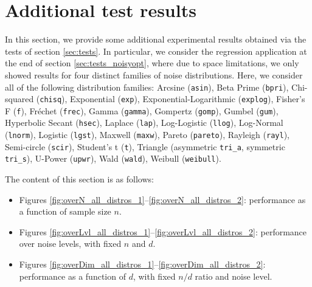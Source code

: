 \documentclass[11pt,oneside]{article}
\theoremstyle{definition} \newtheorem{defn}{Definition}       %
\theoremstyle{plain} \newtheorem{prop}[defn]{Proposition}           %
\theoremstyle{plain} \newtheorem{thm}[defn]{Theorem}                %
\theoremstyle{plain} \newtheorem{lem}[defn]{Lemma}                  %
\theoremstyle{plain} \newtheorem{cor}[defn]{Corollary}              %
\theoremstyle{remark} \newtheorem{rmk}[defn]{Remark}                %
\theoremstyle{remark} \newtheorem{ex}[defn]{Example}                %
\begin{document}
\section{Additional test results}\label{sec:more_test_results}

In this section, we provide some additional experimental results obtained via the tests of section \ref{sec:tests}. In particular, we consider the regression application at the end of section \ref{sec:tests_noisyopt}, where due to space limitations, we only showed results for four distinct families of noise distributions. Here, we consider all of the following distribution families: Arcsine (\texttt{asin}), Beta Prime (\texttt{bpri}), Chi-squared (\texttt{chisq}), Exponential (\texttt{exp}), Exponential-Logarithmic (\texttt{explog}), Fisher's F (\texttt{f}), Fr\'{e}chet (\texttt{frec}), Gamma (\texttt{gamma}), Gompertz (\texttt{gomp}), Gumbel (\texttt{gum}), Hyperbolic Secant (\texttt{hsec}), Laplace (\texttt{lap}), Log-Logistic (\texttt{llog}), Log-Normal (\texttt{lnorm}), Logistic (\texttt{lgst}), Maxwell (\texttt{maxw}), Pareto (\texttt{pareto}), Rayleigh (\texttt{rayl}), Semi-circle (\texttt{scir}), Student's t (\texttt{t}), Triangle (asymmetric \texttt{tri\_a}, symmetric \texttt{tri\_s}), U-Power (\texttt{upwr}), Wald (\texttt{wald}), Weibull (\texttt{weibull}).

The content of this section is as follows:
%
\begin{itemize}
\item Figures \ref{fig:overN_all_distros_1}--\ref{fig:overN_all_distros_2}: performance as a function of sample size $n$. 

\item Figures \ref{fig:overLvl_all_distros_1}--\ref{fig:overLvl_all_distros_2}: performance over noise levels, with fixed $n$ and $d$.

\item Figures \ref{fig:overDim_all_distros_1}--\ref{fig:overDim_all_distros_2}: performance as a function of $d$, with fixed $n/d$ ratio and noise level.
\end{itemize}

\clearpage
\end{document}
